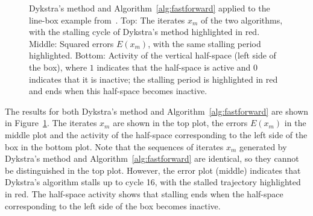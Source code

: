 \begin{figure}[b]
    \caption{Dykstra's method and Algorithm~\ref{alg:fastforward} applied to the line-box example from~\cite{BAUSCHKESWISS}. Top: The iterates $x_m$ of the two algorithms, with the stalling cycle of Dykstra's method highlighted in red. Middle: Squared errors $E(x_m)$, with the same stalling period highlighted. Bottom: Activity of the vertical half-space (left side of the box), where $1$ indicates that the half-space is active and $0$ indicates that it is inactive; the stalling period is highlighted in red and ends when this half-space becomes inactive.}
    \label{fig:stalling2}
\end{figure}

The results for both Dykstra's method and Algorithm~\ref{alg:fastforward} are shown in Figure~\ref{fig:stalling2}. The iterates $x_m$ are shown in the top plot, the errors $E(x_m)$ in the middle plot and the activity of the half-space corresponding to the left side of the box in the bottom plot. Note that the sequences of iterates $x_m$ generated by Dykstra's method and Algorithm~\ref{alg:fastforward} are identical, so they cannot be distinguished in the top plot. However, the error plot (middle) indicates that Dykstra's algorithm stalls up to cycle 16, with the stalled trajectory highlighted in red. The half-space activity shows that stalling ends when the half-space corresponding to the left side of the box becomes inactive.

